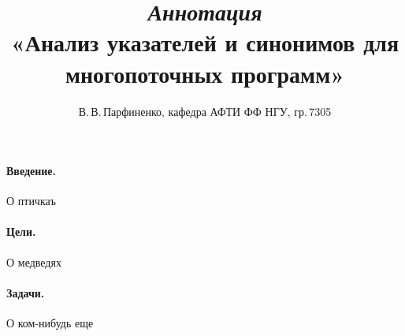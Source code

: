 \documentclass[12pt]{article}
\title{\textit{Аннотация}\\«Анализ указателей и синонимов для многопоточных программ»}
\author{В.\,В.\,Парфиненко, кафедра АФТИ ФФ НГУ, гр.\,7305}
\begin{document}
  \maketitle
  \paragraph{Введение.}
  О птичкаъ
  \paragraph{Цели.}
  О медведях
  \paragraph{Задачи.}
  О ком-нибудь еще
\end{document}
